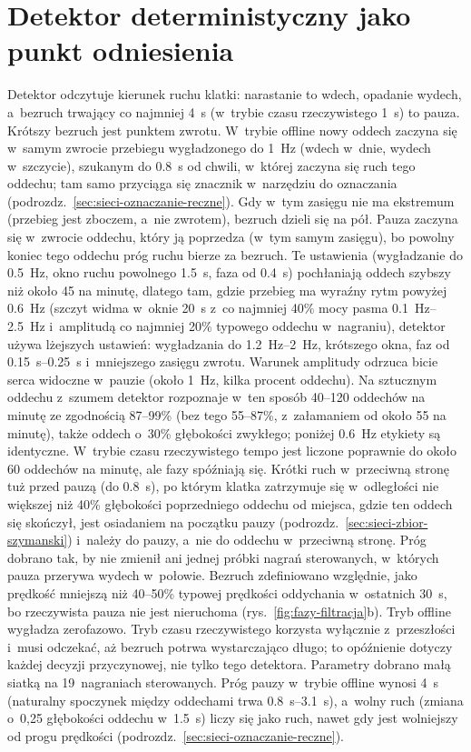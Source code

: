 \documentclass[12pt,a4paper,oneside]{report}
\begin{document}
\section{Detektor deterministyczny jako punkt odniesienia}
\label{sec:sieci-baseline}

Detektor odczytuje kierunek ruchu klatki: narastanie to wdech, opadanie
wydech, a~bezruch trwający co najmniej \SI{4}{s} (w~trybie czasu
rzeczywistego \SI{1}{s}) to pauza. Krótszy bezruch jest punktem zwrotu.
W~trybie offline nowy oddech zaczyna się w~samym zwrocie przebiegu wygładzonego
do \SI{1}{Hz} (wdech w~dnie, wydech w~szczycie), szukanym do \SI{0.8}{s} od
chwili, w~której zaczyna się ruch tego oddechu; tam samo przyciąga się
znacznik w~narzędziu do oznaczania (podrozdz.~\ref{sec:sieci-oznaczanie-reczne}).
Gdy w~tym zasięgu nie ma ekstremum (przebieg jest zboczem, a~nie zwrotem),
bezruch dzieli się na pół. Pauza zaczyna się w~zwrocie oddechu, który ją
poprzedza (w~tym samym zasięgu), bo powolny koniec tego oddechu próg ruchu
bierze za bezruch. Te ustawienia (wygładzanie do \SI{0.5}{Hz}, okno ruchu powolnego
\SI{1.5}{s}, faza od \SI{0.4}{s}) pochłaniają oddech szybszy niż około 45 na minutę,
dlatego tam, gdzie przebieg ma wyraźny rytm powyżej \SI{0.6}{Hz} (szczyt widma
w~oknie \SI{20}{s} z~co najmniej 40\% mocy pasma \SIrange{0.1}{2.5}{Hz} i~amplitudą
co najmniej 20\% typowego oddechu w~nagraniu), detektor używa lżejszych ustawień:
wygładzania do \SIrange{1.2}{2}{Hz}, krótszego okna, faz od \SIrange{0.15}{0.25}{s}
i~mniejszego zasięgu zwrotu. Warunek amplitudy odrzuca bicie serca widoczne w~pauzie
(około \SI{1}{Hz}, kilka procent oddechu). Na sztucznym oddechu z~szumem detektor
rozpoznaje w~ten sposób \numrange{40}{120} oddechów na minutę ze zgodnością
87--99\% (bez tego 55--87\%, z~załamaniem od około 55 na minutę), także oddech
o~30\% głębokości zwykłego; poniżej \SI{0.6}{Hz} etykiety są identyczne. W~trybie
czasu rzeczywistego tempo jest liczone poprawnie do około 60 oddechów na minutę,
ale fazy spóźniają się. Krótki ruch w~przeciwną stronę tuż przed
pauzą (do \SI{0.8}{s}), po którym klatka zatrzymuje się w~odległości nie
większej niż 40\% głębokości poprzedniego oddechu od miejsca, gdzie ten
oddech się skończył, jest osiadaniem na początku pauzy
(podrozdz.~\ref{sec:sieci-zbior-szymanski}) i~należy do pauzy, a~nie do
oddechu w~przeciwną stronę. Próg dobrano tak, by nie zmienił ani
jednej próbki nagrań sterowanych, w~których pauza przerywa wydech w~połowie.
Bezruch zdefiniowano względnie, jako
prędkość mniejszą niż 40--50\% typowej prędkości oddychania w~ostatnich
\SI{30}{s}, bo rzeczywista pauza nie jest nieruchoma
(rys.~\ref{fig:fazy-filtracja}b). Tryb offline wygładza zerofazowo. Tryb czasu rzeczywistego korzysta
wyłącznie z~przeszłości i~musi odczekać, aż bezruch potrwa wystarczająco
długo; to opóźnienie dotyczy każdej decyzji przyczynowej, nie tylko tego
detektora. Parametry dobrano małą siatką na 19~nagraniach sterowanych. Próg
pauzy w~trybie offline wynosi \SI{4}{s} (naturalny spoczynek między oddechami trwa \SIrange{0.8}{3.1}{s}),
a~wolny ruch (zmiana o~0,25 głębokości oddechu w~\SI{1.5}{s}) liczy się jako ruch, nawet gdy jest
wolniejszy od progu prędkości (podrozdz.~\ref{sec:sieci-oznaczanie-reczne}).
\end{document}
